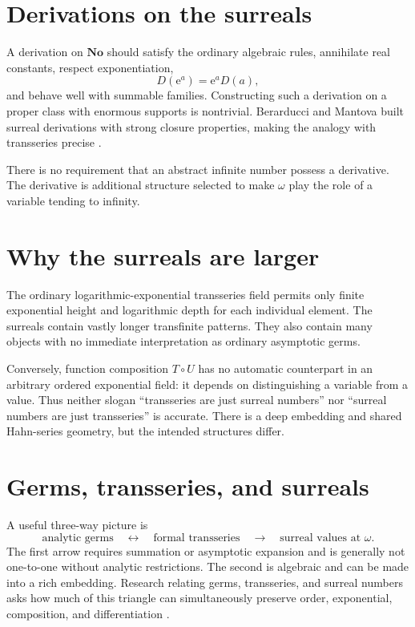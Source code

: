 \documentclass[11pt,oneside]{book}
\theoremstyle{definition}
\theoremstyle{remark}
\newcommand{\e}{\mathrm{e}}
\newcommand{\compose}{\mathbin{\circ}}
\begin{document}
\section{Derivations on the surreals}

A derivation on $\mathbf{No}$ should satisfy the ordinary algebraic rules,
annihilate real constants, respect exponentiation,
\[
  D(\e^a)=\e^aD(a),
\]
and behave well with summable families. Constructing such a derivation on a
proper class with enormous supports is nontrivial. Berarducci and Mantova built
surreal derivations with strong closure properties, making the analogy with
transseries precise \cite{BerarducciMantovaSurreal}.

There is no requirement that an abstract infinite number possess a derivative.
The derivative is additional structure selected to make $\omega$ play the role
of a variable tending to infinity.

\section{Why the surreals are larger}

The ordinary logarithmic-exponential transseries field permits only finite
exponential height and logarithmic depth for each individual element. The
surreals contain vastly longer transfinite patterns. They also contain many
objects with no immediate interpretation as ordinary asymptotic germs.

Conversely, function composition $T\compose U$ has no automatic counterpart in
an arbitrary ordered exponential field: it depends on distinguishing a variable
from a value. Thus neither slogan ``transseries are just surreal numbers'' nor
``surreal numbers are just transseries'' is accurate. There is a deep embedding
and shared Hahn-series geometry, but the intended structures differ.

\section{Germs, transseries, and surreals}

A useful three-way picture is
\[
  \boxed{\text{analytic germs}}
  \quad\longleftrightarrow\quad
  \boxed{\text{formal transseries}}
  \quad\longrightarrow\quad
  \boxed{\text{surreal values at }\omega}.
\]
The first arrow requires summation or asymptotic expansion and is generally not
one-to-one without analytic restrictions. The second is algebraic and can be
made into a rich embedding. Research relating germs, transseries, and surreal
numbers asks how much of this triangle can simultaneously preserve order,
exponential, composition, and differentiation
\cite{BerarducciMantovaGerms,NumbersGermsTransseries}.
\end{document}
